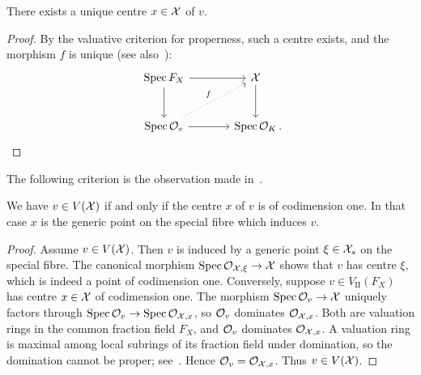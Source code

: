 \begin{lemma}
    There exists a unique centre $x \in \mathcal X$ of $v$.
\end{lemma}

\begin{proof}
    By the valuative criterion for properness, such a centre exists, and the morphism $f$ is unique
    (see also~\cite[\href{https://stacks.math.columbia.edu/tag/01J5}{Section 01J5, Lemma 01J6}]{Stacks}):
    \[
        \begin{tikzcd}[column sep=large, row sep=large]
            \Spec F_X \arrow[d] \arrow[r]                 & \X \arrow[d] \\
            \Spec \OO_v \arrow[r] \arrow[ru, "f", dotted] & \Spec \OK  \cdpunkt
        \end{tikzcd}
    \]
\end{proof}

The following criterion is the observation made in~\cite[Example 3.11]{Rueth}.

\begin{lemma}\label{lem:codim1}
    We have $v \in V(\mathcal X)$ if and only if the centre $x$ of $v$ is of codimension one.
    In that case $x$ is the generic point on the special fibre which induces $v$.
\end{lemma}

\begin{proof}
    Assume $v \in V(\mathcal X)$.
    Then $v$ is induced by a generic point $\xi \in \mathcal X_s$ on the special fibre.
    The canonical morphism $\operatorname{Spec} \mathcal{O}_{\mathcal X, \xi} \to \mathcal X$ shows that $v$ has centre $\xi$,  which is indeed a point of codimension one.
    Conversely, suppose $v \in V_\textrm{II}(F_X)$ has centre $x \in \mathcal X$ of codimension one.
    The morphism $\operatorname{Spec} \mathcal{O}_v \to \mathcal X$ uniquely factors through $\operatorname{Spec} \mathcal{O}_v \to \operatorname{Spec} \mathcal{O}_{\mathcal X, x}$, so $\mathcal{O}_v$ dominates $\mathcal{O}_{\mathcal X, x}$.
    Both are valuation rings in the common fraction field $F_X$, and $\mathcal{O}_v$ dominates $\mathcal{O}_{\mathcal X,x}$.
    A valuation ring is maximal among local subrings of its fraction field under domination, so the domination cannot be proper; see~\cite[\href{https://stacks.math.columbia.edu/tag/00I8}{Definition 10.50.1}]{Stacks}.
    Hence $\mathcal{O}_v=\mathcal{O}_{\mathcal X,x}$.
    Thus \(v \in V(\mathcal X)\).
\end{proof}

